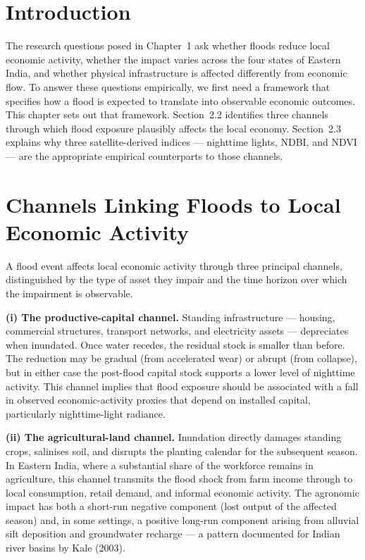 \documentclass[12pt,a4paper,oneside]{report}
\begin{document}
\section{Introduction}
The research questions posed in Chapter~1 ask whether floods reduce local economic activity, whether the impact varies across the four states of Eastern India, and whether physical infrastructure is affected differently from economic flow. To answer these questions empirically, we first need a framework that specifies how a flood is expected to translate into observable economic outcomes. This chapter sets out that framework. Section~2.2 identifies three channels through which flood exposure plausibly affects the local economy. Section~2.3 explains why three satellite-derived indices --- nighttime lights, NDBI, and NDVI --- are the appropriate empirical counterparts to those channels.

\section{Channels Linking Floods to Local Economic Activity}
A flood event affects local economic activity through three principal channels, distinguished by the type of asset they impair and the time horizon over which the impairment is observable.

\textbf{(i) The productive-capital channel.} Standing infrastructure --- housing, commercial structures, transport networks, and electricity assets --- depreciates when inundated. Once water recedes, the residual stock is smaller than before. The reduction may be gradual (from accelerated wear) or abrupt (from collapse), but in either case the post-flood capital stock supports a lower level of nighttime activity. This channel implies that flood exposure should be associated with a fall in observed economic-activity proxies that depend on installed capital, particularly nighttime-light radiance.

\textbf{(ii) The agricultural-land channel.} Inundation directly damages standing crops, salinises soil, and disrupts the planting calendar for the subsequent season. In Eastern India, where a substantial share of the workforce remains in agriculture, this channel transmits the flood shock from farm income through to local consumption, retail demand, and informal economic activity. The agronomic impact has both a short-run negative component (lost output of the affected season) and, in some settings, a positive long-run component arising from alluvial silt deposition and groundwater recharge --- a pattern documented for Indian river basins by Kale (2003).
\end{document}
